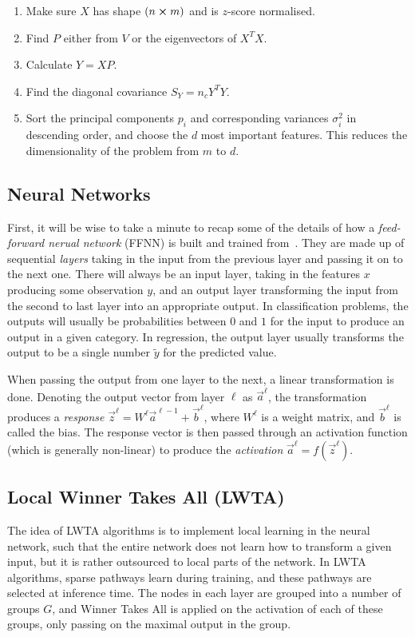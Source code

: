 
    \begin{enumerate}
        \item Make sure $X$ has shape $(n\cross m)$ and is $z$-score normalised.
        \item Find $P$ either from $V$ or the eigenvectors of $X^TX$.
        \item Calculate $Y=XP$.
        \item Find the diagonal covariance $S_Y=n_cY^TY$.
        \item Sort the principal components $p_i$ and corresponding variances $\sigma^2_i$ in descending order, and choose the $d$ most important features. This reduces the dimensionality of the problem from $m$ to $d$.
    \end{enumerate}



     

\subsection{Neural Networks}
    First, it will be wise to take a minute to recap some of the details of how a \textit{feed-forward nerual network} (FFNN) is built and trained from~\cite{Project2}. They are made up of sequential \textit{layers} taking in the input from the previous layer and passing it on to the next one. There will always be an input layer, taking in the features $x$ producing some observation $y$, and an output layer transforming the input from the second to last layer into an appropriate output. In classification problems, the outputs will usually be probabilities between $0$ and $1$ for the input to produce an output in a given category. In regression, the output layer usually transforms the output to be a single number $\tilde{y}$ for the predicted value.

    When passing the output from one layer to the next, a linear transformation is done. Denoting the output vector from layer $\ell$ as $\vec{a}^\ell$, the transformation produces a \textit{response} $\vec{z}^{\ell} = W^\ell \vec{a}^{\ell-1} + \vec{b}^\ell$, where $W^\ell$ is a weight matrix, and $\vec{b}^\ell$ is called the bias. The response vector is then passed through an activation function (which is generally non-linear) to produce the \textit{activation} $\vec{a}^\ell = f(\vec{z}^\ell)$.

\subsection{Local Winner Takes All (LWTA)}
    The idea of LWTA algorithms is to implement local learning in the neural network, such that the entire network does not learn how to transform a given input, but it is rather outsourced to local parts of the network. In LWTA algorithms, sparse pathways learn during training, and these pathways are selected at inference time. The nodes in each layer are grouped into a number of groups $G$, and Winner Takes All is applied on the activation of each of these groups, only passing on the maximal output in the group.

